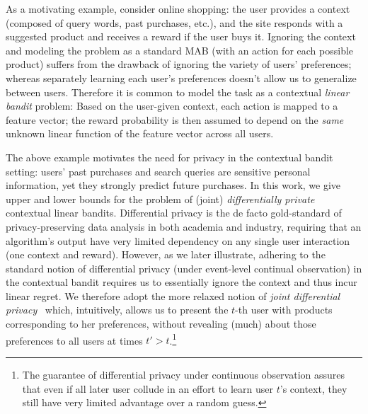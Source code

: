 \documentclass{article}
\begin{document}

As a motivating example, consider online shopping: the user provides a
context (composed of query words, past purchases, etc.), and the site
responds with a suggested product and receives a reward if the user
buys it.  Ignoring the context and modeling the problem as a standard
MAB (with an action for each possible product) suffers from the
drawback of ignoring the variety of users' preferences; whereas separately
learning each user's preferences doesn't allow us to generalize
between users.  Therefore it is common to model the task as a
contextual \emph{linear bandit} problem: Based on the user-given
context, each action is mapped to a feature vector; the
reward probability is then assumed to depend on the \emph{same} unknown linear
function of the feature vector across all users.

The above example motivates the need for privacy in the contextual
bandit setting: users' past purchases and search queries are sensitive personal
information, yet they strongly predict future purchases.
In this work, we give upper and lower bounds for the
problem of (joint) \emph{differentially private} contextual linear
bandits. Differential privacy is the de facto gold-standard of
privacy-preserving data analysis in both academia and industry,
requiring that an algorithm's output have very limited dependency on
any single user interaction (one context and reward).  However, as we
later illustrate, adhering to the standard notion of differential
privacy (under event-level continual observation) in the contextual bandit
requires us to essentially ignore the context and thus incur linear
regret.  We therefore adopt the more relaxed notion of \emph{joint
  differential privacy}~\citep{KearnsMechanismDesign2014} which,
intuitively, allows us to present the $t$-th user with products
corresponding to her preferences, without revealing (much) about those
preferences to all users at times $t'>t$.\footnote{The guarantee of
  differential privacy under continuous observation assures that 
  even if all later user collude in an effort to learn user $t$'s
  context, they still have very limited advantage over a random
  guess.}
\end{document}
